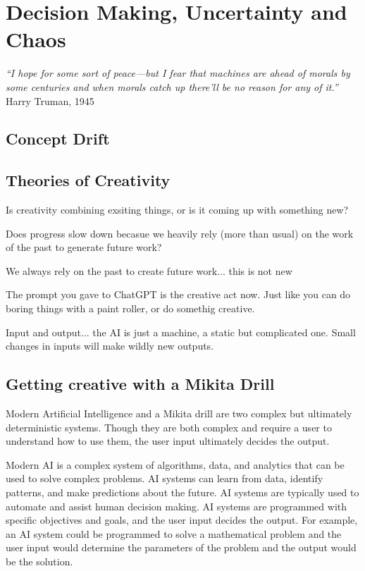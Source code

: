 \setchapterpreamble[u]{\margintoc}
\chapter{Decision Making, Uncertainty and Chaos}

\textit{“I hope for some sort of peace—but I fear that machines are ahead of morals by some centuries and when morals catch up there'll be no reason for any of it.”} Harry Truman, 1945 \cite{McCullough1992}



\section{Concept Drift}

\section{Theories of Creativity}

Is creativity combining exsiting things, or is it coming up with something new?

Does progress slow down becasue we heavily rely (more than usual) on the work of the past to generate future work?

We always rely on the past to create future work... this is not new

The prompt you gave to ChatGPT is the creative act now. Just like you can do boring things with a paint roller, or do somethig creative.

Input and output... the AI is just a machine, a static but complicated one. Small changes in inputs will make wildly new outputs.

\section{Getting creative with a Mikita Drill}

Modern Artificial Intelligence and a Mikita drill are two complex but ultimately deterministic systems. Though they are both complex and require a user to understand how to use them, the user input ultimately decides the output.

Modern AI is a complex system of algorithms, data, and analytics that can be used to solve complex problems. AI systems can learn from data, identify patterns, and make predictions about the future. AI systems are typically used to automate and assist human decision making. AI systems are programmed with specific objectives and goals, and the user input decides the output. For example, an AI system could be programmed to solve a mathematical problem and the user input would determine the parameters of the problem and the output would be the solution.

